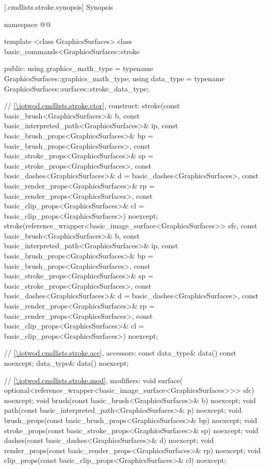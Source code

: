  [\iotwod.cmdlists.stroke.synopsis] {Synopsis}
\begin{codeblock}
namespace @\fullnamespace{}@ {
  template <class GraphicsSurfaces>
  class basic_commands<GraphicsSurfaces::stroke {
  public:
    using graphics_math_type = typename GraphicsSurfaces::graphics_math_type;
    using data_type = typename GraphicsSurfaces::surfaces::stroke_data_type;

    // \ref{\iotwod.cmdlists.stroke.ctor}, construct:
    stroke(const basic_brush<GraphicsSurfaces>& b,
      const basic_interpreted_path<GraphicsSurfaces>& ip,
      const basic_brush_props<GraphicsSurfaces>& bp = 
      basic_brush_props<GraphicsSurfaces>{},
      const basic_stroke_props<GraphicsSurfaces>& sp = 
      basic_stroke_props<GraphicsSurfaces>{},
      const basic_dashes<GraphicsSurfaces>& d = 
      basic_dashes<GraphicsSurfaces>{},
      const basic_render_props<GraphicsSurfaces>& rp = 
      basic_render_props<GraphicsSurfaces>{},
      const basic_clip_props<GraphicsSurfaces>& cl = 
      basic_clip_props<GraphicsSurfaces>{}) noexcept;
    stroke(reference_wrapper<basic_image_surface<GraphicsSurfaces>> sfc,
      const basic_brush<GraphicsSurfaces>& b,
      const basic_interpreted_path<GraphicsSurfaces>& ip,
      const basic_brush_props<GraphicsSurfaces>& bp = 
      basic_brush_props<GraphicsSurfaces>{},
      const basic_stroke_props<GraphicsSurfaces>& sp = 
      basic_stroke_props<GraphicsSurfaces>{},
      const basic_dashes<GraphicsSurfaces>& d =
      basic_dashes<GraphicsSurfaces>{},
      const basic_render_props<GraphicsSurfaces>& rp = 
      basic_render_props<GraphicsSurfaces>{},
      const basic_clip_props<GraphicsSurfaces>& cl = 
      basic_clip_props<GraphicsSurfaces>{}) noexcept;
    
    // \ref{\iotwod.cmdlists.stroke.acc}, accessors:
    const data_type& data() const noexcept;
    data_type& data() noexcept;

    // \ref{\iotwod.cmdlists.stroke.mod}, modifiers:
    void surface(
      optional<reference_wrapper<basic_image_surface<GraphicsSurfaces>>> sfc) 
      noexcept;
    void brush(const basic_brush<GraphicsSurfaces>& b) noexcept;
    void path(const basic_interpreted_path<GraphicsSurfaces>& p) noexcept;
    void brush_props(const basic_brush_props<GraphicsSurfaces>& bp) noexcept;
    void stroke_props(const basic_stroke_props<GraphicsSurfaces>& sp) noexcept;
    void dashes(const basic_dashes<GraphicsSurfaces>& d) noexcept;
    void render_props(const basic_render_props<GraphicsSurfaces>& rp) noexcept;
    void clip_props(const basic_clip_props<GraphicsSurfaces>& cl) noexcept;

}}
\end{codeblock}
